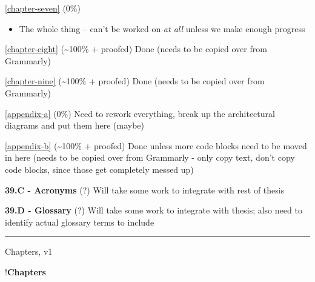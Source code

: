\autoref{chapter-seven} (0\%)

\begin{itemize}
\tightlist
\item
  The whole thing -- can't be worked on \emph{at all} unless we make
  enough progress
\end{itemize}

\autoref{chapter-eight} (\textasciitilde100\% + proofed) Done (needs
to be copied over from Grammarly)

\autoref{chapter-nine} (\textasciitilde100\% + proofed) Done (needs
to be copied over from Grammarly)

\autoref{appendix-a} (0\%) Need to rework everything,
break up the architectural diagrams and put them here (maybe)

\autoref{appendix-b} (\textasciitilde100\% + proofed) Done
unless more code blocks need to be moved in here (needs to be copied
over from Grammarly - only copy text, don't copy code blocks, since
those get completely messed up)

\textbf{39.C - Acronyms} (?) Will take some work to integrate with rest
of thesis

\textbf{39.D - Glossary} (?) Will take some work to integrate with
thesis; also need to identify actual glossary terms to include

\begin{center}\rule{0.5\linewidth}{0.5pt}\end{center}

Chapters, v1

!\textbf{Chapters}
